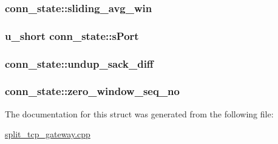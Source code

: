 \hypertarget{structconn__state_a8d3755db1df176609fed254073db8328}{
\subsubsection[{sliding\-\_\-avg\-\_\-win}]{ {\bf conn\-\_\-state\-::sliding\-\_\-avg\-\_\-win}}}\label{structconn__state_a8d3755db1df176609fed254073db8328}
\hypertarget{structconn__state_ad3301160ee6f1d88ce6bb145c66c0b43}{
\subsubsection[{s\-Port}]{\setlength{\rightskip}{0pt plus 5cm}u\-\_\-short {\bf conn\-\_\-state\-::s\-Port}}}\label{structconn__state_ad3301160ee6f1d88ce6bb145c66c0b43}
\hypertarget{structconn__state_a37e8fb8d514d1541ba303a055f0fee2e}{
\subsubsection[{undup\-\_\-sack\-\_\-diff}]{ {\bf conn\-\_\-state\-::undup\-\_\-sack\-\_\-diff}}}\label{structconn__state_a37e8fb8d514d1541ba303a055f0fee2e}
\hypertarget{structconn__state_a677070ed93c317417c5331597a0a962d}{
\subsubsection[{zero\-\_\-window\-\_\-seq\-\_\-no}]{ {\bf conn\-\_\-state\-::zero\-\_\-window\-\_\-seq\-\_\-no}}}\label{structconn__state_a677070ed93c317417c5331597a0a962d}


\-The documentation for this struct was generated from the following file\-:\begin{DoxyCompactItemize}
\item 
\hyperlink{split__tcp__gateway_8cpp}{split\-\_\-tcp\-\_\-gateway.\-cpp}\end{DoxyCompactItemize}
